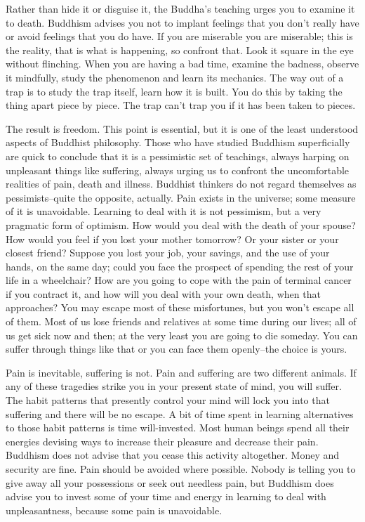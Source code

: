 Rather than hide it or disguise it, the Buddha's teaching urges you to examine
it to death. Buddhism advises you not to implant feelings that you don't really
have or avoid feelings that you do have. If you are miserable you are miserable;
this is the reality, that is what is happening, so confront that. Look it square
in the eye without flinching. When you are having a bad time, examine the
badness, observe it mindfully, study the phenomenon and learn its mechanics. The
way out of a trap is to study the trap itself, learn how it is built. You do
this by taking the thing apart piece by piece. The trap can't trap you if it has
been taken to pieces.

The result is freedom.  This point is essential, but it is one of the least
understood aspects of Buddhist philosophy. Those who have studied Buddhism
superficially are quick to conclude that it is a pessimistic set of teachings,
always harping on unpleasant things like suffering, always urging us to confront
the uncomfortable realities of pain, death and illness. Buddhist thinkers do not
regard themselves as pessimists--quite the opposite, actually. Pain exists in
the universe; some measure of it is unavoidable. Learning to deal with it is not
pessimism, but a very pragmatic form of optimism. How would you deal with the
death of your spouse? How would you feel if you lost your mother tomorrow? Or
your sister or your closest friend? Suppose you lost your job, your savings, and
the use of your hands, on the same day; could you face the prospect of spending
the rest of your life in a wheelchair? How are you going to cope with the pain
of terminal cancer if you contract it, and how will you deal with your own
death, when that approaches? You may escape most of these misfortunes, but you
won't escape all of them. Most of us lose friends and relatives at some time
during our lives; all of us get sick now and then; at the very least you are
going to die someday. You can suffer through things like that or you can face
them openly--the choice is yours.

Pain is inevitable, suffering is not. Pain and suffering are two different
animals. If any of these tragedies strike you in your present state of mind, you
will suffer. The habit patterns that presently control your mind will lock you
into that suffering and there will be no escape. A bit of time spent in learning
alternatives to those habit patterns is time will-invested. Most human beings
spend all their energies devising ways to increase their pleasure and decrease
their pain. Buddhism does not advise that you cease this activity altogether.
Money and security are fine. Pain should be avoided where possible. Nobody is
telling you to give away all your possessions or seek out needless pain, but
Buddhism does advise you to invest some of your time and energy in learning to
deal with unpleasantness, because some pain is unavoidable.


